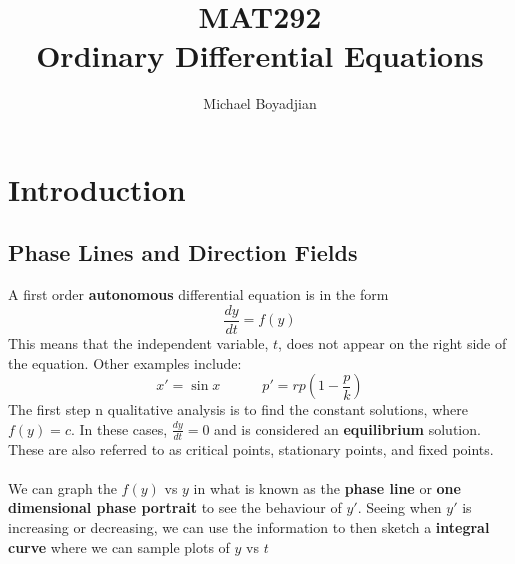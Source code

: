 \documentclass[11pt]{article}
\begin{document}
\title{MAT292 \\ Ordinary Differential Equations}
\author{Michael Boyadjian}
\maketitle
\pagebreak

\tableofcontents

\pagebreak
\section{Introduction}
\subsection{Phase Lines and Direction Fields}
A first order \textbf{autonomous} differential equation is in the form 
$$ \frac{dy}{dt} = f(y)$$ 
This means that the independent variable, $t$, does not appear on the right side of the equation. Other examples include:
$$x' = \sin x \quad \quad \quad p'  = rp\left(1-\frac{p}{k}\right)$$
The first step n qualitative analysis is to find the constant solutions, where $f(y) = c$. In these cases, $\frac{dy}{dt} = 0$ and is considered an \textbf{equilibrium} solution. These are also referred to as critical points, stationary points, and fixed points.
\\ \\
We can graph the $f(y)$ vs $y$ in what is known as the  \textbf{phase line} or \textbf{one dimensional phase portrait} to see the behaviour of $y'$. Seeing when $y'$ is increasing or decreasing, we can use the information to then sketch a \textbf{integral curve} where we can sample plots of $y$ vs $t$
\end{document}

